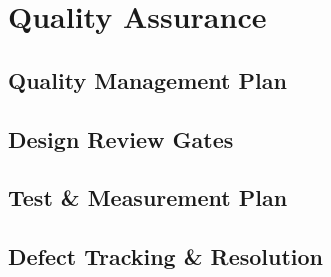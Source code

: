 \section{Quality Assurance}

\subsection{Quality Management Plan}

\subsection{Design Review Gates}

\subsection{Test \& Measurement Plan}

\subsection{Defect Tracking \& Resolution}
